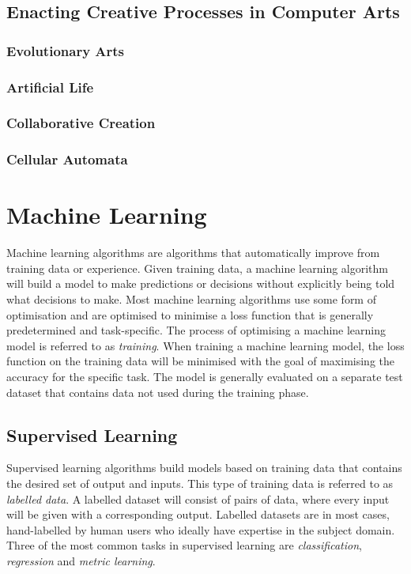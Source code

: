 \subsection{Enacting Creative Processes in Computer Arts}

\subsubsection{Evolutionary Arts}

\subsubsection{Artificial Life}

\subsubsection{Collaborative Creation}

\subsubsection{Cellular Automata}

\section{Machine Learning}
\label{c2:sec:ml}
Machine learning algorithms are algorithms that automatically improve from training data or experience. 
Given training data, a machine learning algorithm will build a model to make predictions or decisions without explicitly being told what decisions to make. 
Most machine learning algorithms use some form of optimisation and are optimised to minimise a loss function that is generally predetermined and task-specific. 
The process of optimising a machine learning model is referred to as \emph{training}. 
When training a machine learning model, the loss function on the training data will be minimised with the goal of maximising the accuracy for the specific task. 
The model is generally evaluated on a separate test dataset that contains data not used during the training phase. 

\subsection{Supervised Learning}

Supervised learning algorithms build models based on training data that contains the desired set of output and inputs. 
This type of training data is referred to as \emph{labelled data}. 
A labelled dataset will consist of pairs of data, where every input will be given with a corresponding output. 
Labelled datasets are in most cases, hand-labelled by human users who ideally have expertise in the subject domain. 
Three of the most common tasks in supervised learning are \emph{classification}, \emph{regression} and \emph{metric learning}. 

